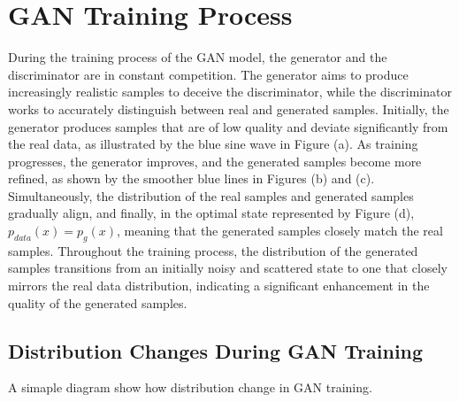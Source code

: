 \section{GAN Training Process}

During the training process of the GAN model, the generator and the discriminator are in constant competition. 
The generator aims to produce increasingly realistic samples to deceive the discriminator, while the discriminator 
works to accurately distinguish between real and generated samples. Initially, the generator produces samples 
that are of low quality and deviate significantly from the real data, as illustrated by the blue sine wave in 
Figure (a). As training progresses, the generator improves, and the generated samples become more refined, 
as shown by the smoother blue lines in Figures (b) and (c). Simultaneously, the distribution of the real samples 
and generated samples gradually align, and finally, in the optimal state represented by Figure (d), 
$p_{data}(x) = p_g(x)$, meaning that the generated samples closely match the real samples. Throughout the 
training process, the distribution of the generated samples transitions from an initially noisy and scattered state 
to one that closely mirrors the real data distribution, indicating a significant enhancement in the quality 
of the generated samples.

\subsection{Distribution Changes During GAN Training}
A simaple diagram show how distribution change in GAN training.

